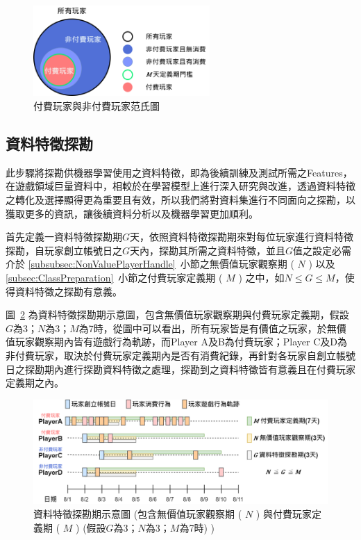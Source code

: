 \begin{figure}[!htb]
  \begin{center}
    \includegraphics[width=0.6\textwidth]{figures/Image_ClassVennChart.png}
    \caption[付費玩家與非付費玩家范氏圖]{付費玩家與非付費玩家范氏圖}
    \label{fig:Image_ClassVennChart}
  \end{center}
\end{figure}
\newpage

\subsection{資料特徵探勘}
\label{subsec:FeatureMining}

此步驟將探勘供機器學習使用之資料特徵，即為後續訓練及測試所需之Features，在遊戲領域巨量資料中，相較於在學習模型上進行深入研究與改進，透過資料特徵之轉化及選擇顯得更為重要且有效\cite{lee2018game}，所以我們將對資料集進行不同面向之探勘，以獲取更多的資訊，讓後續資料分析以及機器學習更加順利。

首先定義一資料特徵探勘期$G$天，依照資料特徵探勘期來對每位玩家進行資料特徵探勘，自玩家創立帳號日之$G$天內，探勘其所需之資料特徵，並且$G$值之設定必需介於 \ref{subsubsec:NonValuePlayerHandle}~小節之無價值玩家觀察期 ( $N$ ) 以及 \ref{subsec:ClassPreparation}~小節之付費玩家定義期 ( $M$ ) 之中，如$N \leq G \leq M$，使得資料特徵之探勘有意義。

圖~\ref{fig:Image_FeatureMining} 為資料特徵探勘期示意圖，包含無價值玩家觀察期與付費玩家定義期，假設$G$為3；$N$為3；$M$為7時，從圖中可以看出，所有玩家皆是有價值之玩家，於無價值玩家觀察期內皆有遊戲行為軌跡，而Player A及B為付費玩家；Player C及D為非付費玩家，取決於付費玩家定義期內是否有消費紀錄，再針對各玩家自創立帳號日之探勘期內進行探勘資料特徵之處理，探勘到之資料特徵皆有意義且在付費玩家定義期之內。

\begin{figure}[!htb]
  \begin{center}
    \includegraphics[width=1\textwidth]{figures/Image_FeatureMining.png}
    \caption[資料特徵探勘期示意圖]{資料特徵探勘期示意圖 (包含無價值玩家觀察期 ( $N$ ) 與付費玩家定義期 ( $M$ )  (假設$G$為3；$N$為3；$M$為7時) ) }
    \label{fig:Image_FeatureMining}
  \end{center}
\end{figure}
\newpage

